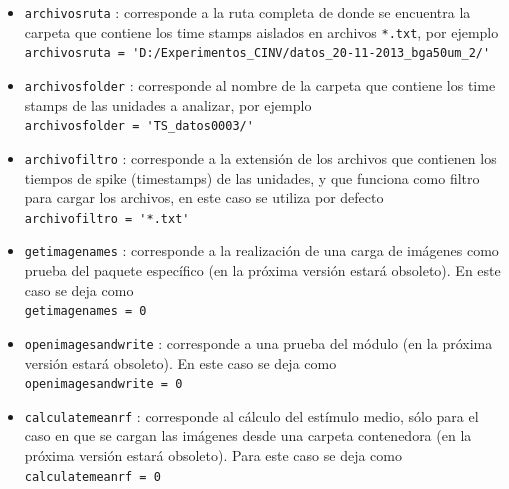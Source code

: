 \documentclass[10pt]{article}
\begin{document}
\begin{itemize}
\item \verb+archivosruta+ : corresponde a la ruta completa de donde se encuentra la carpeta que contiene los time stamps aislados en archivos \verb+*.txt+, por ejemplo\\

\verb+archivosruta = 'D:/Experimentos_CINV/datos_20-11-2013_bga50um_2/'+ \\

\item \verb+archivosfolder+ : corresponde al nombre de la carpeta que contiene los time stamps de las unidades a analizar, por ejemplo \\

\verb+archivosfolder = 'TS_datos0003/'+ \\

\item \verb+archivofiltro+ : corresponde a la extensión de los archivos que contienen los tiempos de spike (timestamps) de las unidades, y que funciona como filtro para cargar los archivos, en este caso se utiliza por defecto \\

\verb+archivofiltro = '*.txt'+ \\

\item \verb+getimagenames+ : corresponde a la realización de una carga de imágenes como prueba del paquete específico (en la próxima versión estará obsoleto). En este caso se deja como \\

 \verb+getimagenames = 0+ \\

\item \verb+openimagesandwrite+ : corresponde a una prueba del módulo (en la próxima versión estará obsoleto). En este caso se deja como \\

\verb+openimagesandwrite = 0+ \\

\item \verb+calculatemeanrf+ : corresponde al cálculo del estímulo medio, sólo para el caso en que se cargan las imágenes desde una carpeta contenedora (en la próxima versión estará obsoleto). Para este caso se deja como \\

\verb+calculatemeanrf = 0 + \\


\end{itemize}
\end{document}
